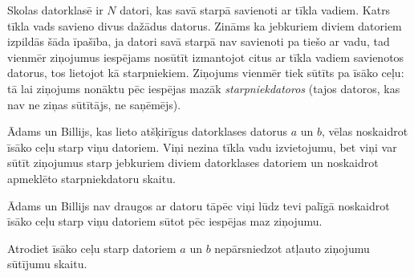 \documentclass{boi2014-lv}
\begin{document}
    
		Skolas datorklasē ir $N$ datori, kas savā starpā savienoti ar tīkla vadiem. Katrs tīkla
		vads savieno divus dažādus datorus. Zināms ka jebkuriem diviem datoriem izpildās šāda īpašība, ja  
		datori savā starpā nav savienoti pa tiešo ar vadu, tad vienmēr ziņojumus iespējams nosūtīt  
		izmantojot citus ar tīkla vadiem savienotos datorus, tos lietojot kā starpniekiem.
		Ziņojums vienmēr tiek sūtīts pa īsāko ceļu: tā lai ziņojums nonāktu pēc iespējas mazāk \emph{starpniekdatoros} 
		(tajos datoros, kas nav ne ziņas sūtītājs, ne saņēmējs).
				
    
		Ādams un Billijs, kas lieto atšķirīgus datorklases datorus $a$ un $b$, vēlas noskaidrot
		īsāko ceļu starp viņu datoriem. Viņi nezina tīkla vadu izvietojumu, bet viņi var sūtīt
		ziņojumus starp jebkuriem diviem datorklases datoriem un noskaidrot apmeklēto starpniekdatoru
		skaitu.
    

		Ādams un Billijs nav draugos ar datoru tāpēc viņi lūdz tevi palīgā noskaidrot īsāko ceļu starp
		viņu datoriem sūtot pēc iespējas maz ziņojumu.

    \Task
		
		Atrodiet īsāko ceļu starp datoriem $a$ un $b$ nepārsniedzot atļauto ziņojumu sūtījumu skaitu.
		
\end{document}
